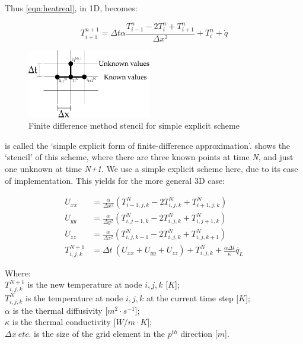 Thus \cref{eqn:heatreal}, in 1D, becomes:

\begin{equation}
T_{i+1}^{n+1} =  \Delta t\alpha \frac{T_{i-1}^n-2T_i^n+T_{i+1}^n}{\Delta x^2} + T_i^n + \dot{q}
\label{eqn:simplefdm}
\end{equation}

\begin{figure}
  \begin{center}
    \includegraphics[width=0.48\textwidth]{./ablation/images/fdm-stencil.pdf}
  \end{center}
  \caption{Finite difference method stencil for simple explicit scheme}\label{fig:fdmstencil}
    \vspace{-20pt}
\end{figure}

 is called the `simple explicit form of finite-difference approximation'\cite{ozisik1994finite}.  shows the `stencil' of this scheme, where there are three known points at time \textit{N}, and just one unknown at time \textit{N+1}. We use a simple explicit scheme here, due to its ease of implementation. This yields for the more general 3D case:


\begin{align}
U_{xx} &= \frac{\alpha}{\Delta x^2} (T^N_{i-1,j,k} - 2T^N_{i,j,k} + T^N_{i+1,j,k}) \label{eqn:FDMheat1}\\
U_{yy} &= \frac{\alpha}{\Delta y^2} (T^N_{i,j-1,k} - 2T^N_{i,j,k} + T^N_{i,j+1,k}) \label{eqn:FDMheat2}\\
U_{zz} &= \frac{\alpha}{\Delta z^2} (T^N_{i,j,k-1} - 2T^N_{i,j,k} + T^N_{i,j,k+1}) \label{eqn:FDMheat3}\\
T^{N+1}_{i,j,k} &= \Delta t\ (U_{xx} + U_{yy} + U_{zz}) + T^{N}_{i,j,k} + \tfrac{\alpha \Delta t}{\kappa}\dot{q_L} \label{eqn:FDMheat4}
\end{align}

\noindent Where:\\
	\indent $T^{N+1}_{i,j,k}$ is the new temperature at node $i,j,k$ [$K$];\\
	\indent $T^N_{i,j,k}$ is the temperature at node $i,j,k$ at the current time step [$K$];\\
	\indent $\alpha$ is the thermal diffusivity [$m^2\cdot s^{-1}$];\\
	\indent $\kappa$ is the thermal conductivity [$W/m\cdot K$];\\
	\indent $\Delta x\ etc.$ is the size of the grid element in the $p^{th}$ direction [$m$].\\

